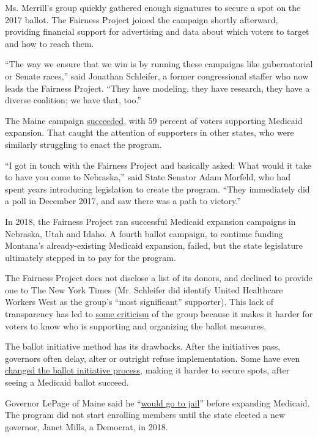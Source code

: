 Ms. Merrill's group quickly gathered enough signatures to secure a spot
on the 2017 ballot. The Fairness Project joined the campaign shortly
afterward, providing financial support for advertising and data about
which voters to target and how to reach them.

``The way we ensure that we win is by running these campaigns like
gubernatorial or Senate races,'' said Jonathan Schleifer, a former
congressional staffer who now leads the Fairness Project. ``They have
modeling, they have research, they have a diverse coalition; we have
that, too.''

The Maine campaign
\href{https://www.nytimes.com/elections/results/maine-ballot-measure-medicaid-expansion}{succeeded},
with 59 percent of voters supporting Medicaid expansion. That caught the
attention of supporters in other states, who were similarly struggling
to enact the program.

``I got in touch with the Fairness Project and basically asked: What
would it take to have you come to Nebraska,'' said State Senator Adam
Morfeld, who had spent years introducing legislation to create the
program. ``They immediately did a poll in December 2017, and saw there
was a path to victory.''

In 2018, the Fairness Project ran successful Medicaid expansion
campaigns in Nebraska, Utah and Idaho. A fourth ballot campaign, to
continue funding Montana's already-existing Medicaid expansion, failed,
but the state legislature ultimately stepped in to pay for the program.

The Fairness Project does not disclose a list of its donors, and
declined to provide one to The New York Times (Mr. Schleifer did
identify United Healthcare Workers West as the group's ``most
significant'' supporter). This lack of transparency has led to
\href{https://www.idahostatesman.com/news/politics-government/state-politics/article228258029.html}{some
criticism} of the group because it makes it harder for voters to know
who is supporting and organizing the ballot measures.

The ballot initiative method has its drawbacks. After the initiatives
pass, governors often delay, alter or outright refuse implementation.
Some have even
\href{https://www.idahostatesman.com/news/politics-government/state-politics/article227828559.html}{changed
the ballot initiative process}, making it harder to secure spots, after
seeing a Medicaid ballot succeed.

Governor LePage of Maine said he
``\href{https://apnews.com/b4ccacffb7e445c08f31c4fc444c2d85/LePage-says-he'd-risk-jail-before-Medicaid-puts-Maine-in-red}{would
go to jail}'' before expanding Medicaid. The program did not start
enrolling members until the state elected a new governor, Janet Mills, a
Democrat, in 2018.

